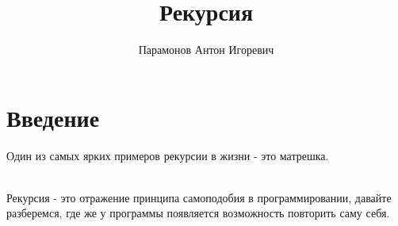 \documentclass[12pt]{article} %
\begin{document}
\title{Рекурсия}
\author{Парамонов Антон Игоревич}
\maketitle

\section{Введение}

Один из самых ярких примеров рекурсии в жизни - это матрешка.\\

\\

Рекурсия - это отражение принципа самоподобия в программировании, давайте разберемся, где же у программы появляется возможность повторить саму себя.
\end{document}

